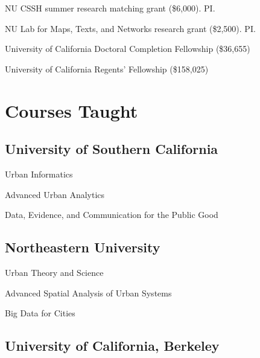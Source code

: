 \documentclass[11pt,letterpaper]{report} %
\newcommand{\listitemspace}{0.25em}
\renewenvironment{itemize}
{
  \begin{list}{}{\setlength{\leftmargin}{0em}
      \setlength{\parskip}{0em}
      \setlength{\itemsep}{\listitemspace}
  \setlength{\parsep}{\listitemspace}}}
  {
\end{list}}
\begin{document}
\begin{tablist}
\item[2019] \tab{}NU CSSH summer research matching grant (\$6,000). PI\@.

\item[2019] \tab{}NU Lab for Maps, Texts, and Networks research grant (\$2,500). PI\@.

\item[2016--17] \tab{}University of California Doctoral Completion Fellowship (\$36,655)

\item[2012--16] \tab{}University of California Regents' Fellowship (\$158,025)

\end{tablist}

\section*{Courses Taught}

\subsection*{University of Southern California}

\begin{itemize}

  \item Urban Informatics
  \item Advanced Urban Analytics
  \item Data, Evidence, and Communication for the Public Good

\end{itemize}

\subsection*{Northeastern University}

\begin{itemize}

  \item Urban Theory and Science
  \item Advanced Spatial Analysis of Urban Systems
  \item Big Data for Cities

\end{itemize}

\subsection*{University of California, Berkeley}
\end{document}
